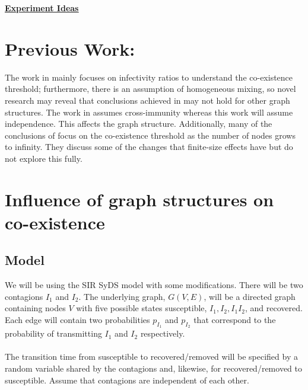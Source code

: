 \documentclass[11pt]{article}
\begin{document}
\newtheorem{theorem}{Theorem}[section]
\newtheorem{lemma}{Lemma}[section]
\newtheorem{corollary}{Corollary}[section]
\newtheorem{fact}{Fact}[section]
\newtheorem{definition}{Definition}[section]
\newtheorem{proposition}{Proposition}[section]
\newtheorem{observation}{Observation}[section]
\newtheorem{claim}{Claim}[section]

\newcommand{\cnp}{\textbf{NP}}
\newcommand{\true}{\texttt{True}}
\newcommand{\false}{\texttt{False}}

\newcommand{\QED}{\hfill\rule{2mm}{2mm}}

\newcommand{\irange}{\mbox{$1 \leq i \leq n$}}
\newcommand{\jrange}{\mbox{$1 \leq j \leq m$}}

\newcommand{\dunder}[1]{\underline{\underline{#1}}}

\setlength{\parskip}{3pt}

\normalbaselineskip

\begin{center}
\dunder{\Large{\textbf{Experiment Ideas}}}
\end{center}


\medskip

\section{Previous Work:}
The work in \cite{10.1145/2339530.2339601} mainly focuses on infectivity ratios to understand the co-existence threshold; furthermore, there is an assumption of homogeneous mixing, so novel research may reveal that conclusions achieved in \cite{10.1145/2339530.2339601} may not hold for other graph structures. The work in \cite{Karrer_2011} assumes cross-immunity whereas this work will assume independence. This affects the graph structure. Additionally, many of the conclusions of \cite{Karrer_2011} focus on the co-existence threshold as the number of nodes grows to infinity. They discuss some of the changes that finite-size effects have but do not explore this fully.

\section{Influence of graph structures on co-existence} 
\subsection{Model}
    We will be using the SIR SyDS model with some modifications. There will be two
    contagions $I_{1}$ and $I_{2}$. The underlying graph, $G(V,E)$, will be a directed graph
    containing nodes $V$ with five possible states susceptible, $I_{1}, I_{2}, I_{1}I_{2}$, and recovered. Each edge will contain two probabilities $p_{I_{1}}$ and $p_{I_{2}}$ that correspond to the probability of transmitting $I_{1}$ and $I_{2}$ respectively. \\ \\ 
    The transition time from susceptible to recovered/removed will be specified by a random variable shared by the contagions and, likewise, for recovered/removed to susceptible. Assume that contagions are independent of each other.
\end{document}

